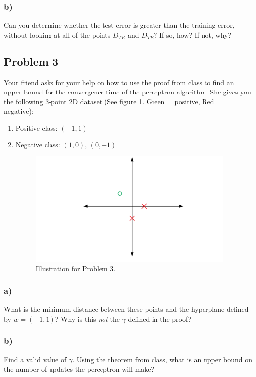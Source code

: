 \documentclass[a4paper]{article}
\begin{document}
\subsubsection*{b)}
Can you determine whether the test error is greater than the training error, without looking at all of the points $D_{TR}$ and $D_{TE}$? If so, how? If not, why?

\subsection*{Problem 3}
Your friend asks for your help on how to use the proof from class to find an upper bound for the convergence time of the perceptron algorithm. She gives you the following 3-point 2D dataset (See figure 1. Green = positive, Red = negative):
\begin{enumerate}
\item Positive class: $(-1, 1)$
\item Negative class: $(1,0)$, $(0,-1)$

\begin{figure}[h!]
	\includegraphics[width=10cm]{p3.pdf}
	\centering
	\caption{Illustration for Problem 3.}
\end{figure}
\end{enumerate}
\subsubsection*{a)}
What is the minimum distance between these points and the hyperplane defined by $w=(-1,1)$? Why is this \textit{not} the $\gamma$ defined in the proof?
\subsubsection*{b)}
Find a valid value of $\gamma$. Using the theorem from class, what is an upper bound on the number of updates the perceptron will make?
\end{document}
